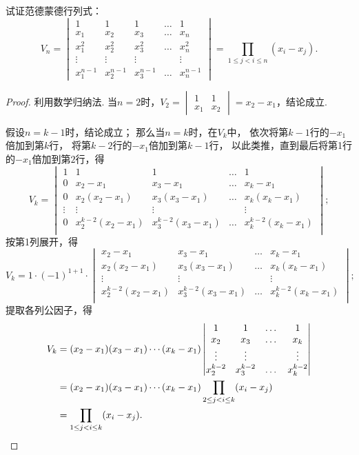 \begin{example}
试证范德蒙德行列式：
\begin{equation}\label{equation:行列式.范德蒙德行列式}
	V_n = \begin{vmatrix}
		1 & 1 & 1 & \dots & 1 \\
		x_1 & x_2 & x_3 & \dots & x_n \\
		x_1^2 & x_2^2 & x_3^2 & \dots & x_n^2 \\
		\vdots & \vdots & \vdots& & \vdots \\
		x_1^{n-1} & x_2^{n-1} & x_3^{n-1} & \dots & x_n^{n-1}
	\end{vmatrix}
	= \prod_{1 \leq j < i \leq n}(x_i-x_j).
\end{equation}
\begin{proof}
利用数学归纳法.
当\(n=2\)时，\(V_2 = \begin{vmatrix}
	1 & 1 \\ x_1 & x_2
\end{vmatrix} = x_2 - x_1\)，结论成立.

假设\(n=k-1\)时，结论成立；
那么当\(n=k\)时，在\(V_k\)中，
依次将第\(k-1\)行的\(-x_1\)倍加到第\(k\)行，
将第\(k-2\)行的\(-x_1\)倍加到第\(k-1\)行，
以此类推，直到最后将第1行的\(-x_1\)倍加到第\(2\)行，得\[
	V_k = \begin{vmatrix}
		1 & 1 & 1 & \dots & 1 \\
		0 & x_2 - x_1 & x_3 - x_1 & \dots & x_k - x_1 \\
		0 & x_2(x_2 - x_1) & x_3(x_3 - x_1) & \dots & x_k(x_k - x_1) \\
		\vdots & \vdots & \vdots & & \vdots \\
		0 & x_2^{k-2}(x_2 - x_1) & x_3^{k-2}(x_3 - x_1) & \dots & x_k^{k-2}(x_k - x_1) \\
	\end{vmatrix};
\]
按第1列展开，得\[
	V_k = 1 \cdot (-1)^{1+1} \cdot \begin{vmatrix}
		x_2 - x_1 & x_3 - x_1 & \dots & x_k - x_1 \\
		x_2(x_2 - x_1) & x_3(x_3 - x_1) & \dots & x_k(x_k - x_1) \\
		\vdots & \vdots & & \vdots \\
		x_2^{k-2}(x_2 - x_1) & x_3^{k-2}(x_3 - x_1) & \dots & x_k^{k-2}(x_k - x_1) \\
	\end{vmatrix};
\]
提取各列公因子，得
\begin{align*}
	V_k &= (x_2 - x_1)(x_3 - x_1)\dotsm(x_k - x_1) \begin{vmatrix}
		1 & 1 & \dots & 1 \\
		x_2 & x_3 & \dots & x_k \\
		\vdots & \vdots & & \vdots \\
		x_2^{k-2} & x_3^{k-2} & \dots & x_k^{k-2} \\
	\end{vmatrix} \\
	&= (x_2 - x_1)(x_3 - x_1)\dotsm(x_k - x_1)
		\prod_{2 \leq j < i \leq k}(x_i - x_j) \\
	&= \prod_{1 \leq j < i \leq k}(x_i - x_j).
	\qedhere
\end{align*}
\end{proof}
\end{example}
